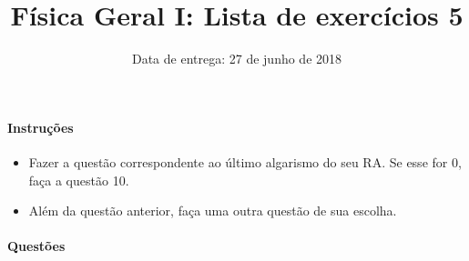 \documentclass[twocolumn=on,DIV=calc]{scrartcl}
\title{Física Geral I: Lista de exercícios 5}
\author{Data de entrega: 27 de junho de 2018}
\date{}
\begin{document}
\maketitle

\paragraph{Instruções}

\begin{itemize}
\item Fazer a questão correspondente ao último algarismo do seu RA. Se
  esse for $0$, faça a questão 10.
\item Além da questão anterior, faça uma outra questão de sua escolha.
\end{itemize}

\paragraph{Questões}
\end{document}
